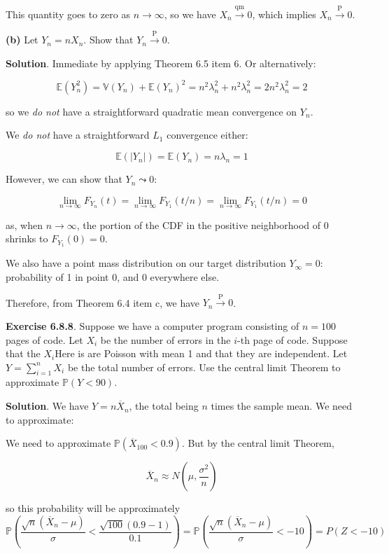 This quantity goes to zero as \(n \rightarrow \infty\), so we have
\(X_{n} \xrightarrow{\text{qm}} 0\), which implies
\(X_{n} \xrightarrow{\text{P}} 0\).

\textbf{(b)} Let \(Y_{n} = n X_{n}\). Show that
\(Y_{n} \xrightarrow{\text{P}} 0\).

\textbf{Solution}. Immediate by applying Theorem 6.5 item 6. Or
alternatively:

\[
\mathbb{E}(Y_{n}^{2}) = \mathbb{V}(Y_{n}) + \mathbb{E}(Y_{n})^{2}
= n^{2} \lambda_{n}^{2} + n^{2}\lambda_{n}^{2} = 2 n^{2} \lambda_{n}^{2} = 2
\]

so we \emph{do not} have a straightforward quadratic mean convergence on
\(Y_{n}\).

We \emph{do not} have a straightforward \(L_{1}\) convergence either:

\[\mathbb{E}(|Y_{n}|) = \mathbb{E}(Y_{n}) = n \lambda_{n} = 1\]

However, we can show that \(Y_{n} \leadsto 0\):

\[\lim _{n \rightarrow \infty} F_{Y_{n}}(t) = \lim _{n \rightarrow \infty} F_{Y_{1}}(t / n) = \lim _{n \rightarrow \infty} F_{Y_{1}}(t / n) = 0 \]

as, when \(n \rightarrow \infty\), the portion of the CDF in the
positive neighborhood of 0 shrinks to \(F_{Y_{1}}(0) = 0\).

We also have a point mass distribution on our target distribution
\(Y_{\infty} = 0\): probability of 1 in point 0, and 0 everywhere else.

Therefore, from Theorem 6.4 item c, we have
\(Y_{n} \xrightarrow{\text{P}} 0\).

\textbf{Exercise 6.8.8}. Suppose we have a computer program consisting
of \(n = 100\) pages of code. Let \(X_{i}\) be the number of errors in the
\(i\)-th page of code. Suppose that the \(X_{i}\)Here is are Poisson with mean
1 and that they are independent. Let \(Y = \sum_{i=1}^{n} X_{i}\) be the
total number of errors. Use the central limit Theorem to approximate
\(\mathbb{P}(Y < 90)\).

\textbf{Solution}. We have \(Y = n \overline{X}_{n}\), the total being
\(n\) times the sample mean. We need to approximate:

We need to approximate \(\mathbb{P}(\overline{X}_{100} < 0.9)\). But by
the central limit Theorem,

\[ \overline{X}_{n} \approx N\left(\mu, \frac{\sigma^{2}}{n}\right) \]

so this probability will be approximately \[
\mathbb{P}\left(\frac{\sqrt{n}(\overline{X}_{n} - \mu)}{\sigma} < \frac{\sqrt{100}(0.9 - 1)}{0.1}\right) 
= \mathbb{P}\left(\frac{\sqrt{n}(\overline{X}_{n} - \mu)}{\sigma} < -10 \right) 
= P(Z < -10)\]

